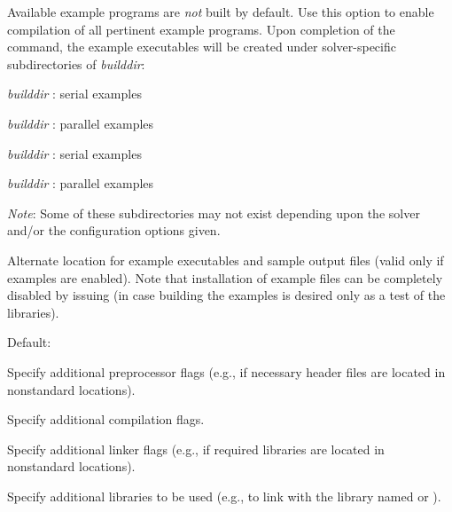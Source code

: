 \begin{config}
  Available example programs are {\em not} built by default. Use this option
  to enable compilation of all pertinent example programs. Upon completion of 
  the  command, the example executables will be created under solver-specific
  subdirectories of {\em builddir}:
  \begin{config}
  \item {\em builddir} : serial {\C} examples
  \item {\em builddir} : parallel {\C} examples
  \item {\em builddir} : serial {\F} examples
  \item {\em builddir} : parallel {\F} examples
  \end{config}  
  {\em Note}: Some of these subdirectories may not exist depending upon the
  solver and/or the configuration options given.

\item {}

  Alternate location for example executables and sample output files (valid only if
  examples are enabled). Note that installation of example files can be completely disabled
  by issuing  (in case building the examples is desired only as a test of
  the {\sundials} libraries).

  Default: 

\item {}

  Specify additional {\C} preprocessor flags 
  (e.g.,  if necessary header files are located in
   nonstandard locations).

\item {}

  Specify additional {\C} compilation flags.

\item {}

  Specify additional linker flags (e.g.,  if
  required libraries are located in nonstandard locations).

\item {}

  Specify additional libraries to be used (e.g.,  to
  link with the library named  or ).


\end{config}

